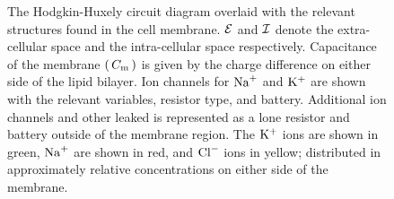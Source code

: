 \documentclass[Orator.tex]{subfiles}
\begin{document}
\begin{figure}[h]

    \caption{The Hodgkin-Huxely circuit diagram overlaid with the relevant structures found in the cell membrane. \(\mathcal{E}\) and \(\mathcal{I}\) denote the extra-cellular space and the intra-cellular space respectively. Capacitance of the membrane \(\br{C_\rmm{m}}\) is given by the charge difference on either side of the lipid bilayer. Ion channels for \(\mathrm{Na}^+\) and \(\mathrm{K}^+\) are shown with the relevant variables, resistor type, and battery. Additional ion channels and other leaked is represented as a lone resistor and battery outside of the membrane region. The \(\mathrm{K}^+\) ions are shown in green, \(\mathrm{Na}^+\) are shown in red, and \(\mathrm{Cl}^-\) ions in yellow; distributed in approximately relative concentrations on either side of the membrane. }
    \label{fig:MembraneCircut}
\end{figure}
\end{document}
